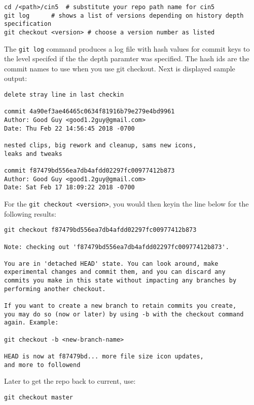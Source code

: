\begin{lstlisting}[style=sh]
cd /<path>/cin5  # substitute your repo path name for cin5
git log		 # shows a list of versions depending on history depth specification
git checkout <version> # choose a version number as listed
\end{lstlisting}

The \texttt{git log} command produces a log file with hash values
for commit keys to the level specifed if the the depth paramter
was specified. 
The hash ids are the commit names to use when you
use git checkout. Next is displayed sample output:

\begin{lstlisting}[style=nil]
delete stray line in last checkin

commit 4a90ef3ae46465c0634f81916b79e279e4bd9961
Author: Good Guy <good1.2guy@gmail.com>
Date: Thu Feb 22 14:56:45 2018 -0700

nested clips, big rework and cleanup, sams new icons,
leaks and tweaks

commit f87479bd556ea7db4afdd02297fc00977412b873
Author: Good Guy <good1.2guy@gmail.com>
Date: Sat Feb 17 18:09:22 2018 -0700
\end{lstlisting}

For the \texttt{git checkout <version>}, you would then keyin the
line below for the following results:

\begin{lstlisting}[style=nil]
git checkout f87479bd556ea7db4afdd02297fc00977412b873

Note: checking out 'f87479bd556ea7db4afdd02297fc00977412b873'.

You are in 'detached HEAD' state. You can look around, make
experimental changes and commit them, and you can discard any
commits you make in this state without impacting any branches by
performing another checkout.

If you want to create a new branch to retain commits you create,
you may do so (now or later) by using -b with the checkout command
again. Example:

git checkout -b <new-branch-name>

HEAD is now at f87479bd... more file size icon updates,
and more to followend
\end{lstlisting}

Later to get the repo back to current, use:
\begin{lstlisting}[style=sh]
git checkout master
\end{lstlisting}


